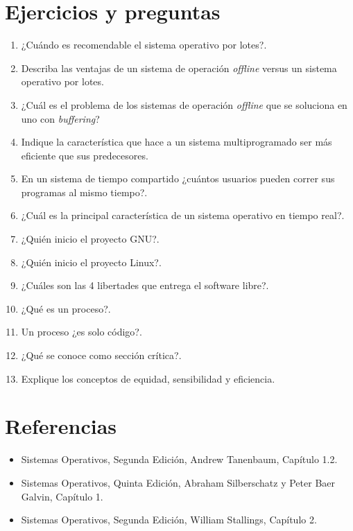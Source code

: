 \section{Ejercicios y preguntas}
\begin{enumerate}

	\item ¿Cuándo es recomendable el sistema operativo por lotes?.

	\item Describa las ventajas de un sistema de operación \textit{offline}
	versus un sistema operativo por lotes.

	\item ¿Cuál es el problema de los sistemas de operación \textit{offline}
	que se soluciona en uno con \textit{buffering}?

	\item Indique la característica que hace a un sistema multiprogramado
	ser más eficiente que sus predecesores.

	\item En un sistema de tiempo compartido ¿cuántos usuarios pueden correr
	sus programas al mismo tiempo?.

	\item ¿Cuál es la principal característica de un sistema operativo en
	tiempo real?.

	\item ¿Quién inicio el proyecto GNU?.

	\item ¿Quién inicio el proyecto Linux?.

	\item ¿Cuáles son las 4 libertades que entrega el software libre?.

	\item ¿Qué es un proceso?.

	\item Un proceso ¿es solo código?.

	\item ¿Qué se conoce como sección crítica?.

	\item Explique los conceptos de equidad, sensibilidad y eficiencia.

\end{enumerate}

\section{Referencias}
\begin{itemize}

	\item Sistemas Operativos, Segunda Edición, Andrew Tanenbaum, Capítulo
	1.2.

	\item Sistemas Operativos, Quinta Edición, Abraham Silberschatz y Peter
	Baer Galvin, Capítulo 1.

	\item Sistemas Operativos, Segunda Edición, William Stallings, Capítulo
	2.

\end{itemize}
